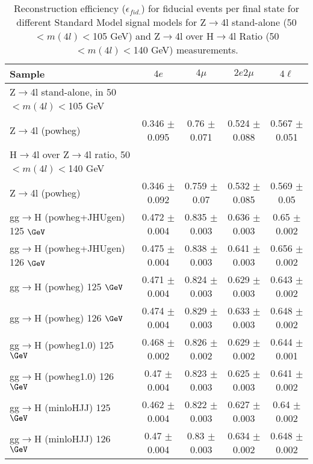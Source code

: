 \begin{sidewaystable}[!h!tb]
\begin{center}
\small
\caption{
Reconstruction efficiency ($\epsilon_{fid.}$) for fiducial events per final state for different Standard Model signal models 
for Z$\to$4l stand-alone (50$<m(4l)<$105 GeV) and Z$\to$4l over H$\to$4l Ratio (50$<m(4l)<$140 GeV) measurements.
\label{tab:efficiencyRatio}
}
\begin{tabular}{|l|c|c|c|c|} \hline
Sample & $4e$ & $4\mu$ & $2e2\mu$ & $4\ell$ \\ \hline
Z$\to$4l stand-alone, in 50$<m(4l)<$105 GeV & & & & \\\hline
Z$\to$4l ({\sc powheg})   & 0.346  $\pm$  0.095  & 0.76  $\pm$  0.071  & 0.524  $\pm$  0.088  & 0.567  $\pm$  0.051  \\
\hline\hline
H$\to$4l over Z$\to$4l ratio, 50$<m(4l)<$140 GeV & & & & \\\hline
Z$\to$4l ({\sc powheg})   & 0.346  $\pm$  0.092  & 0.759  $\pm$  0.07  & 0.532  $\pm$  0.085  & 0.569  $\pm$  0.05  \\
gg$\rightarrow$H ({\sc powheg+JHUgen}) 125 $\GeV$  & 0.472  $\pm$  0.004  & 0.835  $\pm$  0.003  & 0.636  $\pm$  0.003  & 0.65  $\pm$  0.002  \\
gg$\rightarrow$H ({\sc powheg+JHUgen}) 126 $\GeV$  & 0.475  $\pm$  0.004  & 0.838  $\pm$  0.003  & 0.641  $\pm$  0.003  & 0.656  $\pm$  0.002  \\
gg$\rightarrow$H ({\sc powheg}) 125 $\GeV$  & 0.471  $\pm$  0.004  & 0.824  $\pm$  0.003  & 0.629  $\pm$  0.003  & 0.643  $\pm$  0.002  \\
gg$\rightarrow$H ({\sc powheg}) 126 $\GeV$  & 0.474  $\pm$  0.004  & 0.829  $\pm$  0.003  & 0.633  $\pm$  0.003  & 0.648  $\pm$  0.002  \\
gg$\rightarrow$H ({\sc powheg1.0}) 125 $\GeV$  & 0.468  $\pm$  0.002  & 0.826  $\pm$  0.002  & 0.629  $\pm$  0.002  & 0.644  $\pm$  0.001  \\
gg$\rightarrow$H ({\sc powheg1.0}) 126 $\GeV$  & 0.47  $\pm$  0.004  & 0.823  $\pm$  0.003  & 0.625  $\pm$  0.003  & 0.641  $\pm$  0.002  \\
gg$\rightarrow$H ({\sc minloHJJ}) 125 $\GeV$  & 0.462  $\pm$  0.004  & 0.822  $\pm$  0.003  & 0.627  $\pm$  0.003  & 0.64  $\pm$  0.002  \\
gg$\rightarrow$H ({\sc minloHJJ}) 126 $\GeV$  & 0.47  $\pm$  0.004  & 0.83  $\pm$  0.003  & 0.634  $\pm$  0.002  & 0.648  $\pm$  0.002  \\

\end{tabular}
\end{center}
\end{sidewaystable}
